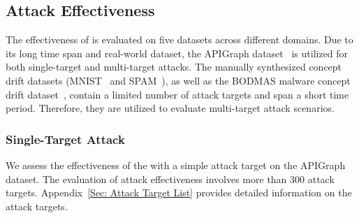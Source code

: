 \subsection{Attack Effectiveness}
\label{Sec: Attack Effectiveness}
The effectiveness of \pandora is evaluated on five datasets across different domains.
Due to its long time span and real-world dataset, the APIGraph dataset~\cite{2020-CCS-APIGraph} is utilized for both single-target and multi-target attacks.
The manually synthesized concept drift datasets (MNIST~\cite{2017-MINIST-dataset} and SPAM~\cite{2010-Spam-Emali-dataset}), as well as the BODMAS malware concept drift dataset~\cite{2021-PE-malware-dataset}, contain a limited number of attack targets and span a short time period.
Therefore, they are utilized to evaluate multi-target attack scenarios.

\subsubsection{Single-Target Attack} 
\label{Sec: Single Attack Targets}
We assess the effectiveness of the \pandora with a simple attack target on the APIGraph~\cite{2020-CCS-APIGraph} dataset.
The evaluation of attack effectiveness involves more than 300 attack targets.
Appendix~\ref{Sec: Attack Target List} provides detailed information on the attack targets.

